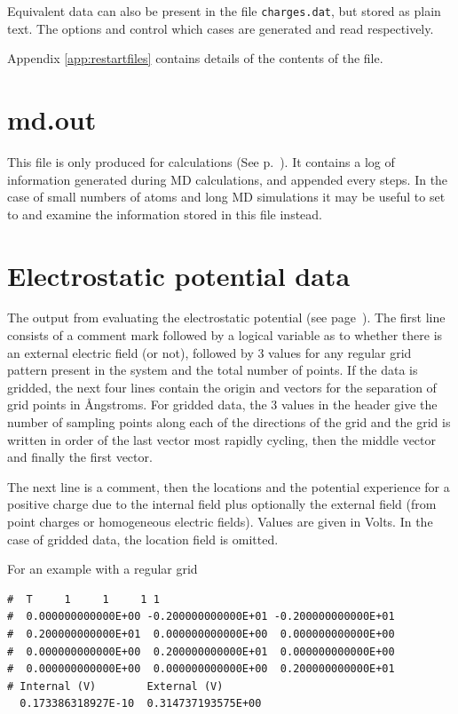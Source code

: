 Equivalent data can also be present in the file \verb|charges.dat|, but stored
as plain text. The options  and 
control which cases are generated and read respectively.

Appendix \ref{app:restartfiles} contains details of the contents of the file.

\section{md.out}
\label{sec:md.out}

This file is only produced for  calculations (See
p.~). It contains a log of information generated during MD
calculations, and appended every  steps. In the case of
small numbers of atoms and long MD simulations it may be useful to set
 to  and examine the information stored in this file
instead.

\section{Electrostatic potential data}
\label{sec:dftbp.espfile}

The output from evaluating the electrostatic potential (see
page~). The first line consists of a comment mark
followed by a logical variable as to whether there is an external
electric field (or not), followed by 3 values for any regular grid
pattern present in the system and the total number of points. If the
data is gridded, the next four lines contain the origin and vectors
for the separation of grid points in {\AA}ngstroms. For gridded data,
the 3 values in the header give the number of sampling points along
each of the directions of the grid and the grid is written in order of
the last vector most rapidly cycling, then the middle vector and
finally the first vector.

The next line is a comment, then the locations and the potential experience for
a positive charge due to the internal field plus optionally the external field
(from point charges or homogeneous electric fields). Values are given in
Volts. In the case of gridded data, the location field is omitted.

For an example with a regular grid
\begin{verbatim}
#  T     1     1     1 1
#  0.000000000000E+00 -0.200000000000E+01 -0.200000000000E+01
#  0.200000000000E+01  0.000000000000E+00  0.000000000000E+00
#  0.000000000000E+00  0.200000000000E+01  0.000000000000E+00
#  0.000000000000E+00  0.000000000000E+00  0.200000000000E+01
# Internal (V)        External (V)
  0.173386318927E-10  0.314737193575E+00
\end{verbatim}

